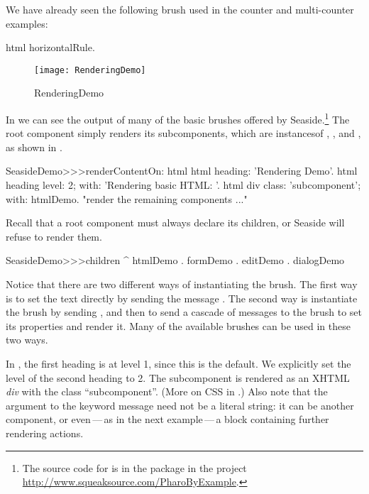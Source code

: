 \documentclass[a4paper,10pt,twoside]{book}
\begin{document}
We have already seen the following brush used in the counter and multi-counter examples:
\begin{code}{}
html horizontalRule.
\end{code}

\begin{figure}[ht]
\begin{center}
\texttt{[image: RenderingDemo]}
\caption{RenderingDemo}
\end{center}
\end{figure}

In  we can see the output of many of the basic brushes offered by
Seaside.\footnote{The source code for  is in the package
 in the project \url{http://www.squeaksource.com/PharoByExample}.}
The root component  simply renders its subcomponents, which are instancesof , ,  and
, as shown in .

\needspace{7ex}
\begin{method}[renderdemo]{}
SeasideDemo>>>renderContentOn: html
	html heading: 'Rendering Demo'.
	html heading
		level: 2;
		with: 'Rendering basic HTML: '.
	html div
		class: 'subcomponent';
		with: htmlDemo.
	"render the remaining components ..."
\end{method}

\noindent
Recall that a root component must always declare its children, or Seaside will refuse to
render them.
\begin{code}{}
SeasideDemo>>>children
	^ { htmlDemo . formDemo . editDemo . dialogDemo }
\end{code}

Notice that there are two different ways of instantiating the  brush.
The first way is to set the text directly by sending the message .
The second way is instantiate the brush by sending , and then to send a
cascade of messages to the brush to set its properties and render it.
Many of the available brushes can be used in these two ways.



In , the first heading is at level 1, since this is the default.
We explicitly set the level of the second heading to 2.
The subcomponent is rendered as an XHTML \emph{div} with the  class
``subcomponent''.
(More on CSS in .)
Also note that the argument to the  keyword message need not be a literal
string: it can be another component, or even\,---\,as in the next example\,---\,a block
containing further rendering actions.
\end{document}
